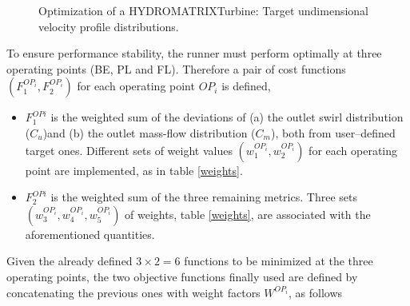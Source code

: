 \begin{figure}[h!]
\begin{minipage}[b]{1\linewidth}
 \centering
\end{minipage}
\caption{Optimization of a HYDROMATRIX\circledR Turbine: Target undimensional velocity profile distributions.}
\label{design-obj-tar-Matrix}
\end{figure}

To ensure performance stability, the runner must perform optimally at three operating points (BE, PL and FL). Therefore a pair of cost functions $(F_1^{OP_i},F_2^{OP_i})$ for each operating point $OP_i$ is defined,

\begin{itemize}
\item $F_1^{OPi}$ is the weighted sum of the deviations of (a) the outlet swirl distribution ($C_u$)and (b) the outlet mass-flow distribution ($C_m$), both from user--defined target ones. Different sets of weight values $(w_1^{OP_i}, w_2^{OP_i})$ for each operating point are implemented, as in table \ref{weights}.
    	
\item $F_2^{OPi}$ is the weighted sum of the three remaining metrics. Three sets $(w_3^{OP_i}, w_4^{OP_i},w_5^{OP_i})$ of weights, table \ref{weights}, are associated with the aforementioned quantities. 
\end{itemize}

Given the already defined $3\!\times\!2\!=\!6$ functions to be minimized at the three operating points, the two objective functions finally used are defined by concatenating the previous ones with weight factors \(W^{OP_i}\), as follows


